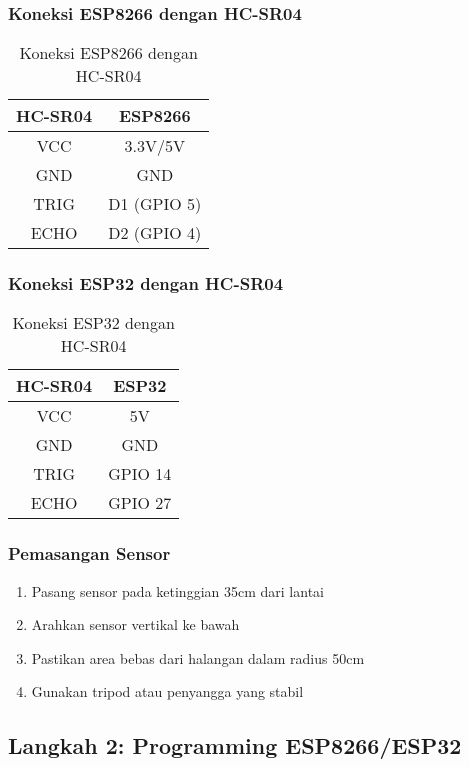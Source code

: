 \documentclass[12pt,a4paper]{article}
\begin{document}
\subsubsection{Koneksi ESP8266 dengan HC-SR04}
\begin{table}[H]
\centering
\begin{tabular}{@{}cc@{}}
\toprule
\textbf{HC-SR04} & \textbf{ESP8266} \\
\midrule
VCC & 3.3V/5V \\
GND & GND \\
TRIG & D1 (GPIO 5) \\
ECHO & D2 (GPIO 4) \\
\bottomrule
\end{tabular}
\caption{Koneksi ESP8266 dengan HC-SR04}
\end{table}

\subsubsection{Koneksi ESP32 dengan HC-SR04}
\begin{table}[H]
\centering
\begin{tabular}{@{}cc@{}}
\toprule
\textbf{HC-SR04} & \textbf{ESP32} \\
\midrule
VCC & 5V \\
GND & GND \\
TRIG & GPIO 14 \\
ECHO & GPIO 27 \\
\bottomrule
\end{tabular}
\caption{Koneksi ESP32 dengan HC-SR04}
\end{table}

\subsubsection{Pemasangan Sensor}
\begin{enumerate}
    \item Pasang sensor pada ketinggian 35cm dari lantai
    \item Arahkan sensor vertikal ke bawah
    \item Pastikan area bebas dari halangan dalam radius 50cm
    \item Gunakan tripod atau penyangga yang stabil
\end{enumerate}

\subsection{Langkah 2: Programming ESP8266/ESP32}
\end{document}
